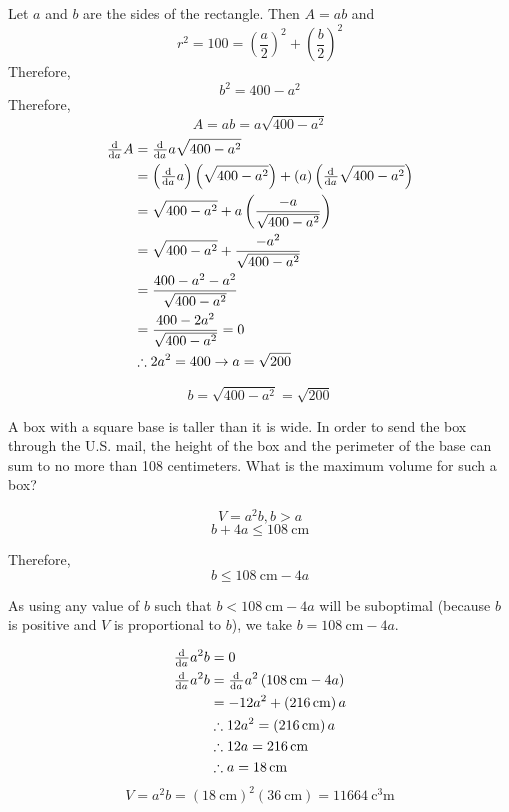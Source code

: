 \documentclass[a4paper, titlepage]{article}
\begin{document}
\begin{Answer}
Let \(a\) and \(b\) are the sides of the rectangle. Then \(A = ab\) and
\[r^2 = 100 = \left( \frac{a}{2} \right)^2 + \left( \frac{b}{2} \right)^2\]
Therefore,
\[b^2 = 400 - a^2\]
Therefore,
\[A = ab = a \sqrt{400 - a^2}\]
\begin{align*}
    \od{}{a} A &= \od{}{a} a \sqrt{400 - a^2} \\
    &= \left( \od{}{a} a \right) \left( \sqrt{400 - a^2} \right)
      + \left( a \right) \left( \od{}{a} \sqrt{400 - a^2} \right) \\
    &= \sqrt{400 - a^2} + a \left(\frac{-a}{\sqrt{400 - a^2}} \right) \\
    &= \sqrt{400 - a^2} + \frac{-a^2}{\sqrt{400 - a^2}} \\
    &= \frac{400 - a^2 - a^2}{\sqrt{400 - a^2}} \\
    &= \frac{400 - 2a^2}{\sqrt{400 - a^2}} = 0 \\
    &\therefore 2a^2 = 400 \rightarrow a = \sqrt{200} \\
\end{align*}

\[b = \sqrt{400 - a^2} = \sqrt{200}\]
\end{Answer}

\begin{Exercise}
A box with a square base is taller than it is wide. In order
to send the box through the U.S. mail, the height of the box
and the perimeter of the base can sum to no more than 108
centimeters. What is the maximum volume for such a box?
\cite{anton-bivens-davis}
\end{Exercise}

\begin{Answer}

\[V = a^2 b, b > a\]
\[b + 4a \le \SI{108}{\centi\meter}\]

Therefore,
\[b \le \SI{108}{\centi\meter} - 4a\]

As using any value of \(b\) such that \(b < \SI{108}{\centi\meter} - 4a\)
will be suboptimal (because \(b\) is positive and \(V\) is proportional to \(b\)),
we take \(b = \SI{108}{\centi\meter} - 4a\).

\begin{align*}
  \od{}{a} a^2 b &= 0 \\
  \od{}{a} a^2 b &= \od{}{a} a^2 \left( \SI{108}{\centi\meter} - 4a \right) \\
                 &= -12 a^2 + \left( \SI{216}{\centi\meter} \right) a \\
                 &\therefore 12 a^2 = \left( \SI{216}{\centi\meter} \right) a \\
                 &\therefore 12 a = \SI{216}{\centi\meter} \\
                 &\therefore a = \SI{18}{\centi\meter}
\end{align*}
\[V = a^2 b = \left( \SI{18}{\centi\meter} \right)^2 \left( \SI{36}{\centi\meter} \right)
            = \SI{11664}{\cubic\centi\meter}\]
\end{Answer}
\end{document}
